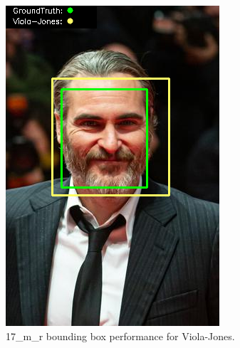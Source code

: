 \documentclass{l4proj}
\begin{document}
\begin{appendices}
\begin{figure}[h!]
\begin{minipage}{0.49\textwidth}
     \includegraphics[width=\textwidth]{images/appendix/viola/17.png}
    \caption{17\_m\_r bounding box performance for Viola-Jones.}
    \label{whoopi_result}
  \end{minipage}
\end{figure}


\end{appendices}
\end{document}
